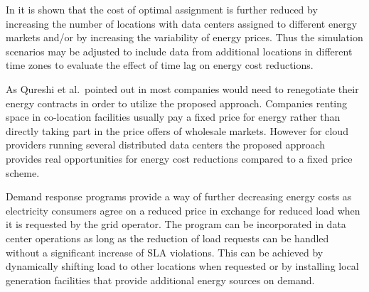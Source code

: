 In \cite{de2013study} it is shown that the cost of optimal assignment is further reduced by increasing the number of locations with data centers assigned to different energy markets and/or by increasing the variability of energy prices. Thus the simulation scenarios may be adjusted to include data from additional locations in different time zones to evaluate the effect of time lag on energy cost reductions. 

As Qureshi et al.~pointed out in \cite{qureshi2009cutting} most companies would need to renegotiate their energy contracts in order to utilize the proposed approach. Companies renting space in co-location facilities usually pay a fixed price for energy rather than directly taking part in the price offers of wholesale markets. However for cloud providers running several distributed data centers the proposed approach provides real opportunities for energy cost reductions compared to a fixed price scheme. 

Demand response programs provide a way of further decreasing energy costs as electricity consumers agree on a reduced price in exchange for reduced load when it is requested by the grid operator\cite{liu2013data}. 
The program can be incorporated in data center operations as long as the reduction of load requests can be handled without a significant increase of SLA violations. 
This can be achieved by dynamically shifting load to other locations when requested or by installing local generation facilities that provide additional energy sources on demand. 


